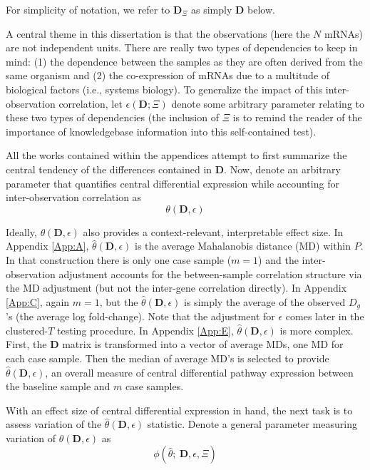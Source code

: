 \noindent \noindent For simplicity of notation, we refer to $\mathbf{D}_{\Xi}$ as simply $\mathbf{D}$ below.

A central theme in this dissertation is that the observations (here the $N$ mRNAs) are not independent units. There are really two types of dependencies to keep in mind: (1) the dependence between the samples as they are often derived from the same organism and (2) the co-expression of mRNAs due to a multitude of biological factors (i.e., systems biology). To generalize the impact of this inter-observation correlation, let $\epsilon(\mathbf{D}; \Xi)$ denote some arbitrary parameter relating to these two types of dependencies (the inclusion of $\Xi$ is to remind the reader of the importance of knowledgebase information into this self-contained test).

All the works contained within the appendices attempt to first summarize the central tendency of the differences contained in $\mathbf{D}$. Now, denote an arbitrary parameter that quantifies central differential expression while accounting for inter-observation correlation as
\begin{equation}
\label{eq:central}
\theta (\mathbf{D}, \epsilon) \tag{1}
\end{equation}

Ideally, $\theta (\mathbf{D}, \epsilon)$ also provides a context-relevant, interpretable effect size. In Appendix \ref{App:A}, $\hat{\theta}(\mathbf{D}, \epsilon)$ is the average Mahalanobis distance (MD) within $P$. In that construction there is only one case sample ($m=1$) and the inter-observation adjustment accounts for the between-sample correlation structure via the MD adjustment (but not the inter-gene correlation directly). In Appendix \ref{App:C}, again $m=1$, but the $\hat{\theta}(\mathbf{D}, \epsilon)$ is simply the average of the observed $D_{g}$\rq s (the average log fold-change). Note that the adjustment for $\epsilon$ comes later in the clustered-$T$ testing procedure. In Appendix \ref{App:E}, $\hat{\theta}(\mathbf{D}, \epsilon)$ is more complex. First, the $\mathbf{D}$ matrix is transformed into a vector of average MDs, one MD for each case sample. Then the median of average MD\rq s is selected to provide $\hat{\theta}(\mathbf{D}, \epsilon)$, an overall measure of central differential pathway expression between the baseline sample and $m$ case samples.

With an effect size of central differential expression in hand, the next task is to assess variation of the $\hat{\theta}(\mathbf{D}, \epsilon)$ statistic. Denote a general parameter measuring variation of $\hat{\theta}(\mathbf{D}, \epsilon)$ as
\begin{equation}
\label{eq:var}
\phi(\hat{\theta};~\mathbf{D},\epsilon,\Xi) \tag{2}
\end{equation}

